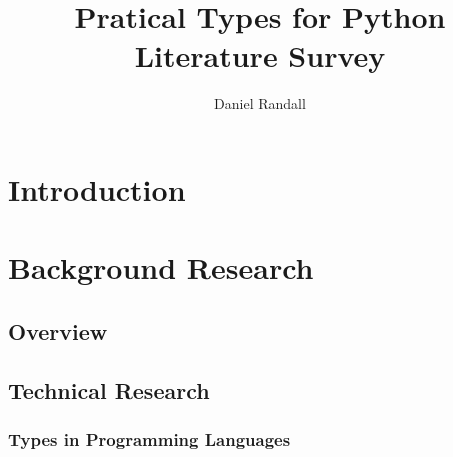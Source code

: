 \documentclass[12pt, titlepage]{article}
\title{Pratical Types for Python \\ Literature Survey}
\author{Daniel Randall}
\date{}
\begin{document}
\maketitle

\tableofcontents
\newpage

\section{Introduction}


\section{Background Research}
\subsection{Overview}


\subsection{Technical Research}

\subsubsection*{Types in Programming Languages}
\end{document}
